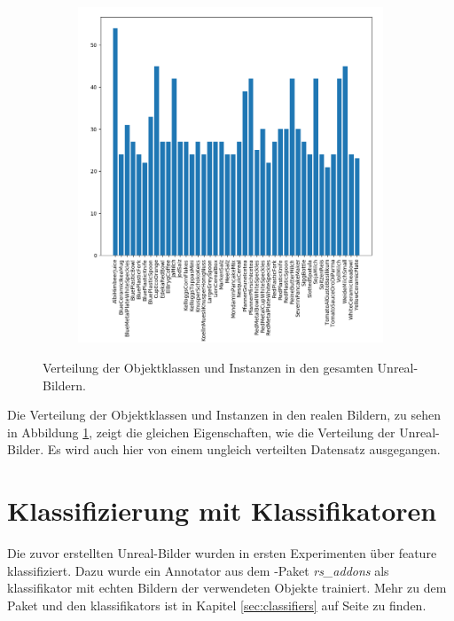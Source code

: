 \begin{figure}
\begin{subfigure}[b]{0.58\textwidth}
		\includegraphics[scale=.4]{img/chapter6/RealGTInstance_analysis.png}	
	\end{subfigure}
\caption[Verteilung der Objekte in den Unreal-Bildern]{Verteilung der Objektklassen und Instanzen in den gesamten Unreal-Bildern.}
\label{fig:Real-Images_analysis}
\end{figure}

Die Verteilung der Objektklassen und Instanzen in den realen Bildern, zu sehen in Abbildung \ref{fig:Real-Images_analysis}, zeigt die gleichen Eigenschaften, wie die Verteilung der Unreal-Bilder. Es wird auch hier von einem ungleich verteilten Datensatz ausgegangen. 


\section{Klassifizierung mit Klassifikatoren}
\label{sec:classificationExperiment}
Die zuvor erstellten Unreal-Bilder wurden in ersten Experimenten über \gls{feature} klassifiziert. Dazu wurde ein Annotator aus dem \robosherlock-Paket \textit{rs\_addons} als \gls{klassifikator} mit echten Bildern der verwendeten Objekte trainiert. Mehr zu dem Paket und den \glspl{klassifikator} ist in Kapitel \ref{sec:classifiers} auf Seite \pageref{sec:classifiers} zu finden. \par

